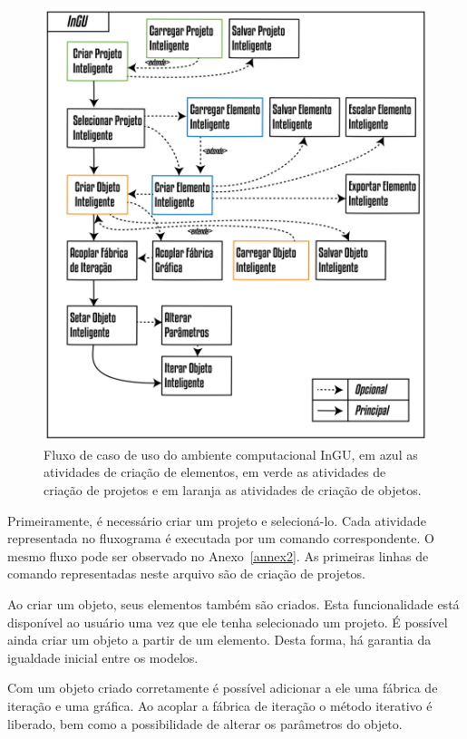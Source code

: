\begin{figure}[!htbp]
	\centering
	\includegraphics[width=\linewidth]{Figures/CasoDeUso@16x.png}
	\caption{Fluxo de caso de uso do ambiente computacional InGU, em azul as atividades de criação de elementos, em verde as atividades de criação de projetos e em laranja as atividades de criação de objetos.}
	\label{fig:caso_uso}
\end{figure}

Primeiramente, é necessário criar um projeto e selecioná-lo. Cada atividade representada no fluxograma é executada por um comando correspondente. O mesmo fluxo pode ser observado no Anexo~\ref{annex2}. As primeiras linhas de comando representadas neste arquivo são de criação de projetos.

Ao criar um objeto, seus elementos também são criados. Esta funcionalidade está disponível ao usuário uma vez que ele tenha selecionado um projeto. É possível ainda criar um objeto a partir de um elemento. Desta forma, há garantia da igualdade inicial entre os modelos.

Com um objeto criado corretamente é possível adicionar a ele uma fábrica de iteração e uma gráfica. Ao acoplar a fábrica de iteração o método iterativo é liberado, bem como a possibilidade de alterar os parâmetros do objeto.

